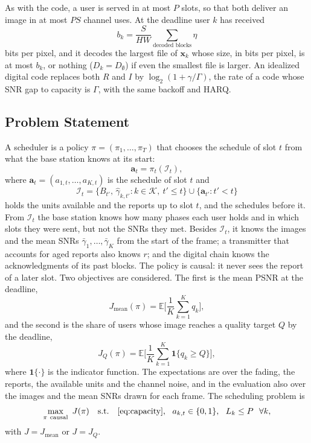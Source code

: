 As with the code, a user is served in at most $P$ slots, so that both deliver an image in at most
$PS$ channel uses. At the deadline user $k$ has received
\begin{equation}
b_k = \frac{S}{HW} \sum_{\text{decoded blocks}} \eta
\label{eq:bpp}
\end{equation}
bits per pixel, and it decodes the largest file of $\mathbf{x}_k$ whose size, in bits per pixel,
is at most $b_k$, or nothing ($D_k = D_\emptyset$) if even the smallest file is larger. An
idealized digital code replaces both $R$ and $I$ by $\log_2(1 + \gamma / \Gamma)$, the rate of a
code whose SNR gap to capacity is $\Gamma$, with the same backoff and HARQ.

\subsection{Problem Statement}
\label{sec:system-problem}

A scheduler is a policy $\pi = (\pi_1, \dots, \pi_T)$ that chooses the schedule of slot $t$ from
what the base station knows at its start:
\begin{equation}
\mathbf{a}_t = \pi_t(\mathcal{I}_t),
\label{eq:policy}
\end{equation}
where $\mathbf{a}_t = (a_{1,t}, \dots, a_{K,t})$ is the schedule of slot $t$ and
\begin{equation}
\mathcal{I}_t = \big\{ B_{t'},\, \hat\gamma_{k,t'} : k \in \mathcal{K},\ t' \le t \big\} \cup
\big\{ \mathbf{a}_{t'} : t' < t \big\}
\label{eq:info}
\end{equation}
holds the units available and the reports up to slot $t$, and the schedules before it. From
$\mathcal{I}_t$ the base station knows how many phases each user holds and in which slots they
were sent, but not the SNRs they met. Besides $\mathcal{I}_t$, it knows the images and the mean
SNRs $\bar\gamma_1, \dots, \bar\gamma_K$ from the start of the frame; a transmitter that accounts
for aged reports also knows $r$; and the digital chain knows the acknowledgments of its past
blocks. The policy is causal: it never sees the report of a later slot. Two objectives are
considered. The first is the mean PSNR at the deadline,
\begin{equation}
J_{\mathrm{mean}}(\pi) = \mathbb{E} \Big[ \frac{1}{K} \sum_{k=1}^{K} q_k \Big],
\label{eq:obj-mean}
\end{equation}
and the second is the share of users whose image reaches a quality target $Q$ by the deadline,
\begin{equation}
J_Q(\pi) = \mathbb{E} \Big[ \frac{1}{K} \sum_{k=1}^{K} \mathbf{1}\{ q_k \ge Q \} \Big],
\label{eq:obj-target}
\end{equation}
where $\mathbf{1}\{\cdot\}$ is the indicator function. The expectations are over the fading, the
reports, the available units and the channel noise, and in the evaluation also over the images
and the mean SNRs drawn for each frame. The scheduling problem is
\begin{equation}
\max_{\pi\ \text{causal}} \ J(\pi) \quad \text{s.t.} \quad \eqref{eq:capacity},\ \
a_{k,t} \in \{0, 1\},\ \ L_k \le P\ \ \forall k,
\label{eq:problem}
\end{equation}
with $J = J_{\mathrm{mean}}$ or $J = J_Q$.

